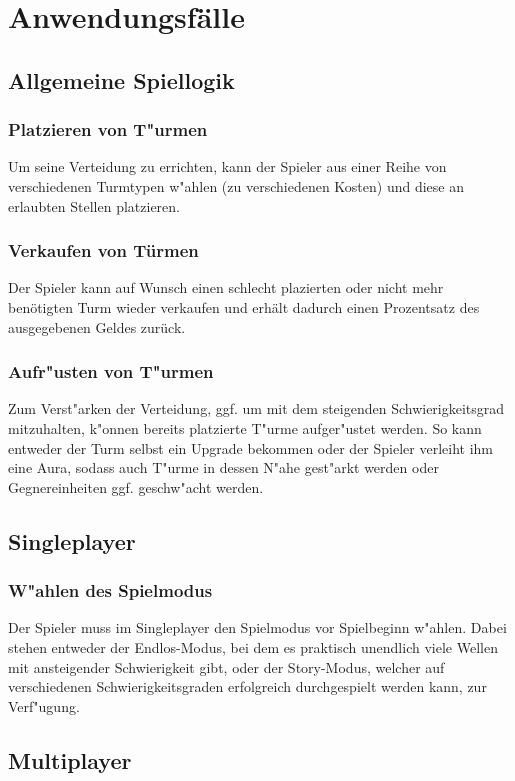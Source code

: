 \documentclass[enabledeprecatedfontcommands,fontsize=12pt,paper=a4,twoside,parskip=half]{scrartcl}
\begin{document}
\clearpage

\section{Anwendungsfälle}
\label{sec:anwendungsfaelle}
\subsection{Allgemeine Spiellogik}
\subsubsection{Platzieren von T"urmen}
Um seine Verteidung zu errichten, kann der Spieler aus einer Reihe von verschiedenen Turmtypen w"ahlen (zu verschiedenen Kosten) und diese an erlaubten Stellen platzieren.
\subsubsection{Verkaufen von Türmen}
Der Spieler kann auf Wunsch einen schlecht plazierten oder nicht mehr benötigten Turm wieder verkaufen und erhält dadurch einen Prozentsatz des ausgegebenen Geldes zurück.
\subsubsection{Aufr"usten von T"urmen}
Zum Verst"arken der Verteidung, ggf. um mit dem steigenden Schwierigkeitsgrad mitzuhalten, k"onnen bereits platzierte T"urme aufger"ustet werden. So kann entweder der Turm selbst ein Upgrade bekommen oder der Spieler verleiht ihm eine Aura, sodass auch T"urme in dessen N"ahe gest"arkt werden oder Gegnereinheiten ggf. geschw"acht werden.
\subsection{Singleplayer}
\subsubsection{W"ahlen des Spielmodus}
Der Spieler muss im Singleplayer den Spielmodus vor Spielbeginn w"ahlen. Dabei stehen entweder der Endlos-Modus, bei dem es praktisch unendlich viele Wellen mit ansteigender Schwierigkeit gibt, oder der Story-Modus, welcher auf verschiedenen Schwierigkeitsgraden erfolgreich durchgespielt werden kann, zur Verf"ugung.

\subsection{Multiplayer}
\end{document}
